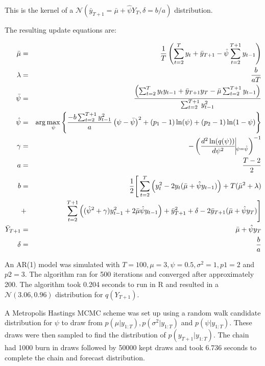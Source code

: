 \documentclass{article}
\begin{document}
This is the kernel of a $\mathcal{N}\left(\bar{y}_{T+1} = \bar{\mu} + \hat{\psi}Y_{T}, \delta = b/a \right)$ distribution.

The resulting update equations are:

\begin{eqnarray*}
\label{update}
\bar{\mu} & = & \frac{1}{T} \left(\sum^{T}_{t=2}y_t + \bar{y}_{T+1} - \hat{\psi}\sum^{T+1}_{t=2}y_{t-1} \right) \\
\lambda & = & \frac{b}{aT} \\
\bar{\psi} & = &\frac{\left(\sum^{T}_{t=2} y_t y_{t-1} + \bar{y}_{T+1}y_T - \bar{\mu} \sum^{T+1}_{t=2} y_{t-1} \right)}{\sum^{T+1}_{t=2} y_{t-1}^2} \\
\hat{\psi} & = & \arg \max_{\psi} \left\{  \frac{-b\sum^{T+1}_{t=2} y_{t-1}^2}{a} \left(\psi - \bar{\psi} \right)^2 + (p_1-1) \ln(\psi) + (p_2-1)\ln(1-\psi) \right\} \\
\gamma & = & -\left(\frac{d^2 \ln(q(\psi))}{d \psi^2} \vline_{\psi = \hat{\psi}}\right)^{-1} \\
a & = & \frac{T-2}{2} \\
b & = & \frac{1}{2} \Bigg[\sum^{T}_{t=2}\left(y_t^2-2y_t(\bar{\mu}+\hat{\psi}y_{t-1})\right) + T(\bar{\mu}^2 + \lambda) \\
& + &  \sum^{T+1}_{t=2}\left((\hat{\psi}^2+\gamma)y_{t-1}^2 + 2\bar{\mu}\hat{\psi}y_{t-1}\right) + \bar{y}_{T+1}^2 + \delta - 2 \bar{y}_{T+1} (\bar{\mu} + \hat{\psi}y_T) \Bigg] \\
\bar{Y}_{T+1} & = & \bar{\mu} + \hat{\psi}y_T \\
\delta & = & \frac{b}{a}
\end{eqnarray*}

An AR(1) model was simulated with $T=100, \mu = 3, \psi = 0.5, \sigma^2 = 1, p1 = 2$ and $p2 = 3$. The algorithm ran for 500 iterations and converged after approximately 200. The algorithm took 0.204 seconds to run in R and resulted in a $\mathcal{N}(3.06, 0.96)$ distribution for $q(Y_{T+1})$.



A Metropolis Hastings MCMC scheme was set up using a random walk candidate distribution for $\psi$ to draw from $p(\mu | y_{1:T}), p(\sigma^2 | y_{1:T})$ and $p(\psi | y_{1:T})$. These draws were then sampled to find the distribution of $p(y_{T+1} | y_{1:T})$.
The chain had 1000 burn in draws followed by 50000 kept draws and took 6.736 seconds to complete the chain and forecast distribution.
\end{document}
